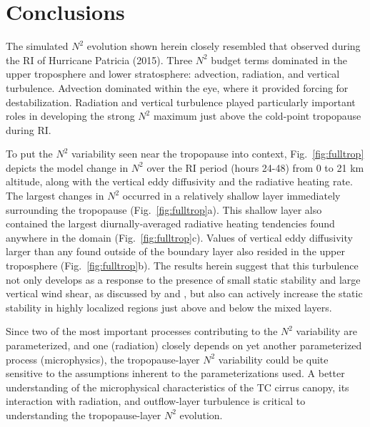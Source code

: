 \documentclass{ametsoc}
\begin{document}
  \section{Conclusions}

The simulated $N^2$ evolution shown herein closely resembled that observed during the RI of Hurricane Patricia (2015).
Three $N^2$ budget terms dominated in the upper troposphere and lower stratosphere: advection, radiation, and vertical turbulence.
Advection dominated within the eye, where it provided forcing for destabilization.
Radiation and vertical turbulence played particularly important roles in developing the strong $N^2$ maximum just above the cold-point tropopause during RI.

To put the $N^2$ variability seen near the tropopause into context, Fig.~\ref{fig:fulltrop} depicts the model change in $N^2$ over the RI period (hours 24-48) from 0 to 21 km altitude, along with the vertical eddy diffusivity and the radiative heating rate.
The largest changes in $N^2$ occurred in a relatively shallow layer immediately surrounding the tropopause (Fig.~\ref{fig:fulltrop}a).
This shallow layer also contained the largest diurnally-averaged radiative heating tendencies found anywhere in the domain (Fig.~\ref{fig:fulltrop}c).
Values of vertical eddy diffusivity larger than any found outside of the boundary layer also resided in the upper troposphere (Fig.~\ref{fig:fulltrop}b).
The results herein suggest that this turbulence not only develops as a response to the presence of small static stability and large vertical wind shear, as discussed by \cite{Molinarietal} and \cite{DuranMolinari2016}, but also can actively increase the static stability in highly localized regions just above and below the mixed layers.

Since two of the most important processes contributing to the $N^2$ variability are parameterized, and one (radiation) closely depends on yet another parameterized process (microphysics), the tropopause-layer $N^2$ variability could be quite sensitive to the assumptions inherent to the parameterizations used.
A better understanding of the microphysical characteristics of the TC cirrus canopy, its interaction with radiation, and outflow-layer turbulence is critical to understanding the tropopause-layer $N^2$ evolution.
\end{document}
